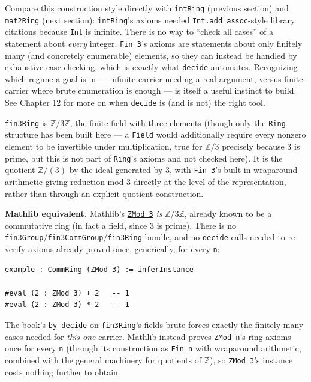 Compare this construction style directly with \texttt{intRing} (previous section) and \texttt{mat2Ring} (next section): \texttt{intRing}'s axioms needed \texttt{Int.add\_\allowbreak{}assoc}-style library citations because \texttt{Int} is infinite. There is no way to ``check all cases'' of a statement about \emph{every} integer. \texttt{Fin 3}'s axioms are statements about only finitely many (and concretely enumerable) elements, so they can instead be handled by exhaustive case-checking, which is exactly what \texttt{decide} automates. Recognizing which regime a goal is in --- infinite carrier needing a real argument, versus finite carrier where brute enumeration is enough --- is itself a useful instinct to build. See Chapter 12 for more on when \texttt{decide} is (and is not) the right tool.

\begin{mathreading}

\texttt{fin3Ring} is \(\mathbb{Z}/3\mathbb{Z}\), the finite field with three elements (though only the \texttt{Ring} structure has been built here --- a \texttt{Field} would additionally require every nonzero element to be invertible under multiplication, true for \(\mathbb{Z}/3\) precisely because \(3\) is prime, but this is not part of \texttt{Ring}'s axioms and not checked here). It is the quotient \(\mathbb{Z}/(3)\) by the ideal generated by \(3\), with \texttt{Fin 3}'s built-in wraparound arithmetic giving reduction mod \(3\) directly at the level of the representation, rather than through an explicit quotient construction.

\end{mathreading}

\textbf{Mathlib equivalent.} Mathlib's \href{https://loogle.lean-lang.org/?q=ZMod}{\texttt{ZMod 3}} \emph{is} \(\mathbb{Z}/3\mathbb{Z}\), already known to be a commutative ring (in fact a field, since \(3\) is prime). There is no \texttt{fin3Group}/\texttt{fin3CommGroup}/\texttt{fin3Ring} bundle, and no \texttt{decide} calls needed to re-verify axioms already proved once, generically, for every \texttt{n}:

\begin{lstlisting}
example : CommRing (ZMod 3) := inferInstance

#eval (2 : ZMod 3) + 2   -- 1
#eval (2 : ZMod 3) * 2   -- 1
\end{lstlisting}

The book's \texttt{by decide} on \texttt{fin3Ring}'s fields brute-forces exactly the finitely many cases needed for \emph{this one} carrier. Mathlib instead proves \texttt{ZMod n}'s ring axioms once for every \texttt{n} (through its construction as \texttt{Fin n} with wraparound arithmetic, combined with the general machinery for quotients of \(\mathbb{Z}\)), so \texttt{ZMod 3}'s instance costs nothing further to obtain.

